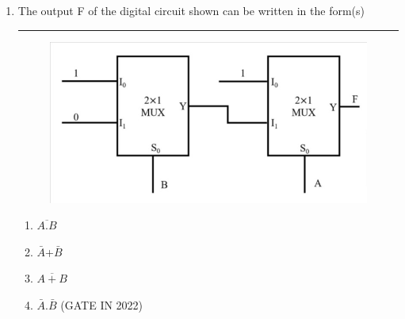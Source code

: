 \documentclass{article}
\begin{document}
\begin{enumerate}
    \item The output F of the digital circuit shown can be written in the form(s)\rule{2cm}{0.5pt}
    \begin{figure}[h]
        \centering
        \includegraphics[width=\columnwidth]{gate.jpg}
        \caption{}
        \label{fig:my_label}
    \end{figure}
    \begin{enumerate}
        \item $\overline{A.B}$
        \item $\bar{A}$+$\bar{B}$
        \item $\overline{A + B}$
        \item $\bar{A}$.$\bar{B}$ \hfill (GATE IN 2022)
    \end{enumerate} 
\end{enumerate}
\end{document}

